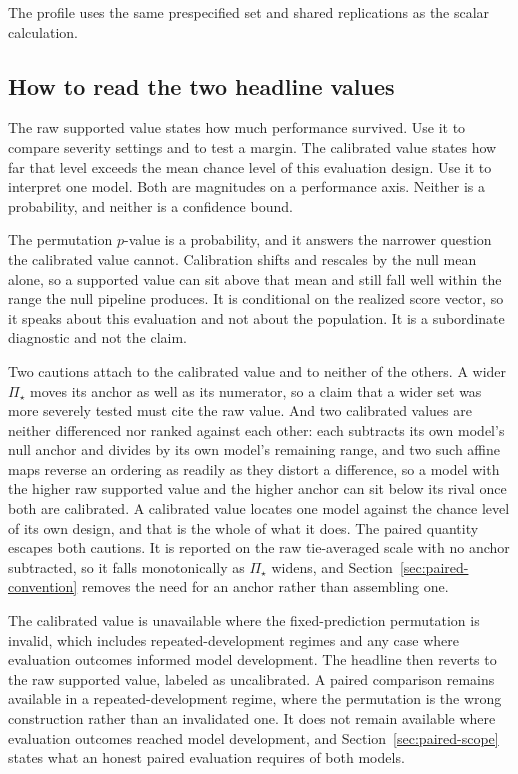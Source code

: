 \documentclass[11pt]{article}
\newcommand{\PSet}{\Pi_\star}
\theoremstyle{remark}
\begin{document}
The profile uses the same prespecified set and shared replications as the scalar calculation.

\subsection{How to read the two headline values}

The raw supported value states how much performance survived. Use it to compare severity settings and to test a margin. The calibrated value states how far that level exceeds the mean chance level of this evaluation design. Use it to interpret one model. Both are magnitudes on a performance axis. Neither is a probability, and neither is a confidence bound.

The permutation $p$-value is a probability, and it answers the narrower question the calibrated value cannot. Calibration shifts and rescales by the null mean alone, so a supported value can sit above that mean and still fall well within the range the null pipeline produces. It is conditional on the realized score vector, so it speaks about this evaluation and not about the population. It is a subordinate diagnostic and not the claim.

Two cautions attach to the calibrated value and to neither of the others. A wider $\PSet$ moves its anchor as well as its numerator, so a claim that a wider set was more severely tested must cite the raw value. And two calibrated values are neither differenced nor ranked against each other: each subtracts its own model's null anchor and divides by its own model's remaining range, and two such affine maps reverse an ordering as readily as they distort a difference, so a model with the higher raw supported value and the higher anchor can sit below its rival once both are calibrated. A calibrated value locates one model against the chance level of its own design, and that is the whole of what it does. The paired quantity escapes both cautions. It is reported on the raw tie-averaged scale with no anchor subtracted, so it falls monotonically as $\PSet$ widens, and Section~\ref{sec:paired-convention} removes the need for an anchor rather than assembling one.

The calibrated value is unavailable where the fixed-prediction permutation is invalid, which includes repeated-development regimes and any case where evaluation outcomes informed model development. The headline then reverts to the raw supported value, labeled as uncalibrated. A paired comparison remains available in a repeated-development regime, where the permutation is the wrong construction rather than an invalidated one. It does not remain available where evaluation outcomes reached model development, and Section~\ref{sec:paired-scope} states what an honest paired evaluation requires of both models.
\end{document}
